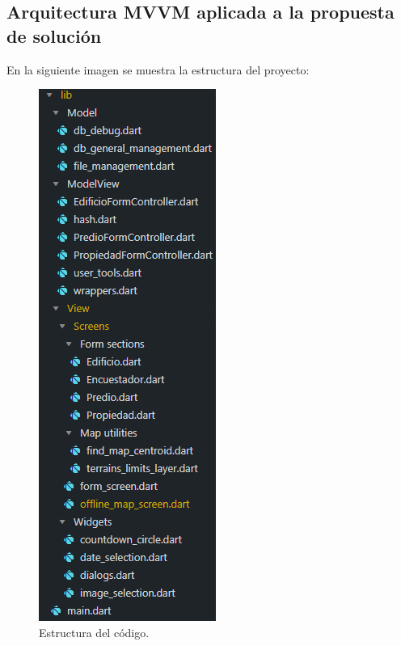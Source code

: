 \subsection{Arquitectura MVVM aplicada a la propuesta de solución}
En la siguiente imagen se muestra la estructura del proyecto:
\begin{figure}[h]
    \centering
    \includegraphics[scale=0.5]{Graphics/Capitulo 3/estructura_del_codigo.png}
    \caption{Estructura del código.} %
    \label{fig:figura15}
\end{figure}

